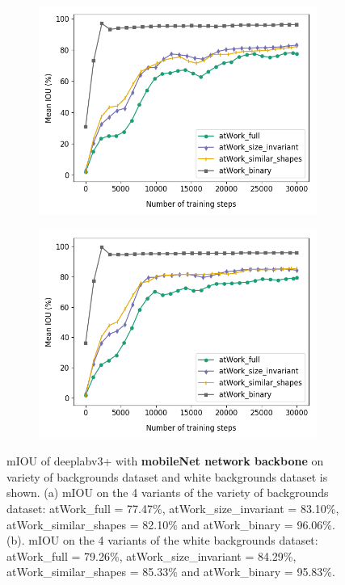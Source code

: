 	\begin{figure}
		\begin{subfigure}{.5\textwidth}
			\centering
			\includegraphics[width=1\linewidth]{images/mobi_4vars}
			\label{Fig:mobivarsa}
			\caption{}
		\end{subfigure}
		\begin{subfigure}{.5\textwidth}
			\centering
			\includegraphics[width=1\linewidth]{images/mobi_4vars_white}
			\label{Fig:mobivarsb}
			\caption{}
		\end{subfigure}
		\caption{mIOU of deeplabv3+ with \textbf{mobileNet network backbone} on variety of backgrounds dataset and white backgrounds dataset is shown. (a) mIOU on the 4 variants of the variety of backgrounds dataset: atWork\_full = 77.47\%, atWork\_size\_invariant = 83.10\%, atWork\_similar\_shapes = 82.10\% and atWork\_binary = 96.06\%. (b). mIOU on the 4 variants of the white backgrounds dataset: atWork\_full = 79.26\%, atWork\_size\_invariant = 84.29\%, atWork\_similar\_shapes = 85.33\% and atWork\_binary = 95.83\%.}
		\label{Fig:mobivars}
	\end{figure}
	
